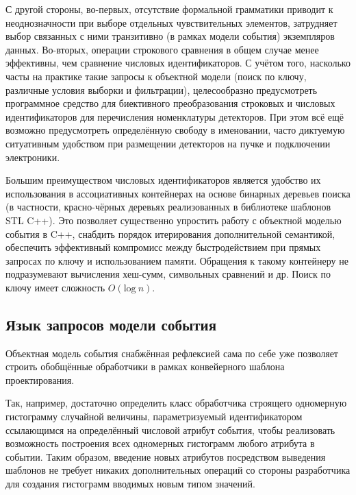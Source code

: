 С другой стороны, во-первых, отсутствие формальной грамматики приводит
к неоднозначности при выборе отдельных чувствительных элементов,
затрудняет выбор связанных с ними транзитивно (в рамках модели
события) экземпляров данных.
Во-вторых, операции строкового сравнения в общем случае менее
эффективны, чем сравнение числовых идентификаторов. С учётом того,
насколько часты на практике такие запросы к объектной
модели (поиск по ключу, различные условия выборки и фильтрации),
целесообразно предусмотреть программное средство для биективного
преобразования строковых и числовых идентификаторов для перечисления
номенклатуры детекторов. При этом всё ещё возможно предусмотреть
определённую свободу в именовании, часто диктуемую ситуативным
удобством при размещении детекторов на пучке и подключении
электроники.

Большим преимуществом числовых идентификаторов является удобство
их использования в ассоциативных контейнерах на основе бинарных
деревьев поиска (в частности, красно-чёрных деревьях реализованных
в библиотеке шаблонов STL C++). Это позволяет существенно упростить
работу с объектной моделью события в C++, снабдить порядок
итерирования дополнительной семантикой, обеспечить эффективный
компромисс между быстродействием при прямых запросах по ключу
и использованием памяти. Обращения к такому контейнеру не подразумевают
вычисления хеш-сумм, символьных сравнений и др. Поиск по ключу имеет
сложность $O(\text{log}~n)$.


\subsection{Язык запросов модели события}

Объектная модель события снабжённая рефлексией сама по себе
уже позволяет строить обобщённые обработчики в рамках конвейерного
шаблона проектирования.

Так, например, достаточно определить класс обработчика строящего
одномерную гистограмму случайной величины, параметризуемый
идентификатором ссылающимся на определённый числовой атрибут события,
чтобы реализовать возможность построения всех одномерных гистограмм
любого атрибута в событии. Таким образом, введение новых атрибутов
посредством выведения шаблонов не требует никаких дополнительных
операций со стороны разработчика для создания гистограмм вводимых новым
типом значений.

